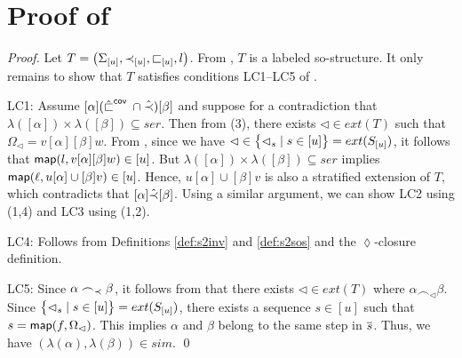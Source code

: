 \documentclass{llncs}
\begin{document}
\section{Proof of }
\begin{proof} Let $T=\bigl(\Sigma_{[u]},\prec_{[u]},\sqsubset_{[u]},l \bigr)$. From , $T$ is a labeled so-structure. It only remains to show that $T$ satisfies conditions \textsf{LC1}--\textsf{LC5} of . 

\textsf{LC1}: Assume  $[\alpha] ({\hat{\sqsubset}}^{\mathsf{cov}\;}\cap \hat{\prec}) [\beta]$ and suppose for a contradiction that $\lambda([\alpha])\times \lambda([\beta]) \subseteq ser$. Then from  (3), there exists $\lhd \in ext(T)$ such that $\Omega_{\lhd} = v[\alpha][\beta]w$. From , since we have $\lhd \in  \bigl\{\lhd_{s}\mid s \in [u]\bigr\} = ext(S_{[u]})$, it follows that $\mathsf{map}(l,v[\alpha][\beta]w) \in [u]$. But  $\lambda([\alpha])\times \lambda([\beta]) \subseteq ser$ implies $\mathsf{map}(\ell,u[\alpha]\cup [\beta]v) \in [u]$. Hence,  $u[\alpha]\cup [\beta]v$ is also a stratified extension of $T$, which contradicts that $[\alpha] \hat{\prec} [\beta]$. Using a similar argument, we can show \textsf{LC2} using  (1,4) and \textsf{LC3} using  (1,2).  

\textsf{LC4}: Follows from Definitions \ref{def:s2inv} and \ref{def:s2sos} and the $\lozenge$-closure definition.

\textsf{LC5}: Since $\alpha \frown_{\prec}\beta$,  it follows from  that there exists $\lhd \in ext(T)$ where $\alpha \frown_\lhd \beta$. Since $\bigl\{\lhd_{s}\mid s \in [u]\bigr\} = ext(S_{[u]})$, there exists a sequence $s\in [u]$ such that $s = \mathsf{map}(f,\Omega_\lhd)$. This implies $\alpha$ and $\beta$ belong to the same step in  $\overline{s}$. Thus, we have $(\lambda(\alpha),\lambda(\beta))\in sim$. \qed
\end{proof}
\end{document}
